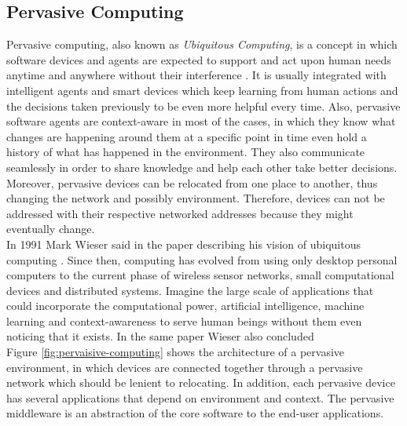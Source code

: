\subsection{Pervasive Computing} 
 Pervasive computing, also known as \textit{Ubiquitous Computing}, is a concept in which software devices and agents are expected to support and act upon human needs anytime and anywhere without their interference \cite{Chen:2003:OCP:991804.991806}. It is usually integrated with intelligent agents and smart devices which keep learning from human actions and the decisions taken previously to be even more helpful every time. Also, pervasive software agents are context-aware in most of the cases, in which they know what changes are happening around them at a specific point in time  even hold a history of what has happened in the environment. They also communicate seamlessly in order to share knowledge and help each other take better decisions. Moreover, pervasive devices can be relocated from one place to another, thus changing the network and possibly environment. Therefore, devices can not be addressed with their respective networked addresses because they might eventually change. \\

\noindent In 1991 Mark Wieser said in the paper describing his vision of ubiquitous computing   \cite{weiser1991ubicomp}. Since then, computing has evolved from using only desktop personal computers to the current phase of wireless sensor networks, small computational devices and distributed systems. Imagine the large scale of applications that could incorporate the computational power, artificial intelligence, machine learning and context-awareness to serve human beings without them even noticing that it exists. In the same paper Wieser also concluded \\



\noindent Figure \ref{fig:pervaisive-computing} shows the architecture of a pervasive environment, in which devices are connected together through a pervasive network which should be lenient to relocating. In addition, each pervasive device has several applications that depend on environment and  context. The pervasive middleware is an abstraction of the core software to the end-user applications.

